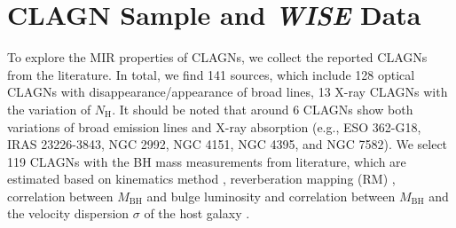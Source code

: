 \documentclass[linenumbers]{aastex631}
\begin{document}



\section{CLAGN Sample and {\it WISE} Data} \label{sec:sample}
To explore the MIR properties of CLAGNs, we collect the reported CLAGNs from the literature. In total, we find 141 sources, which include 128 optical CLAGNs with disappearance/appearance of broad lines, 13 X-ray CLAGNs with the variation of $N_\mathrm{H}$. It should be noted that around 6 CLAGNs show both variations of broad emission lines and X-ray absorption (e.g., ESO 362-G18, IRAS 23226-3843, NGC 2992, NGC 4151, NGC 4395, and NGC 7582). We select 119 CLAGNs with the BH mass measurements from literature, which are estimated based on kinematics method \citep[e.g.,][]{2003MNRAS.345.1057M}, reverberation mapping (RM) \citep[e.g.,][]{2011MNRAS.410.1877S,2017ApJ...840...97F}, correlation between $M_\mathrm{BH}$ and bulge luminosity \citep[$L_\mathrm{bulge}$, e.g.,][]{2006AJ....131.1236D} and correlation between $M_\mathrm{BH}$ and the velocity dispersion $\sigma$ of the host galaxy \citep{2002ApJ...574..740T}. 
\end{document}
